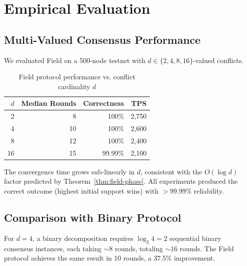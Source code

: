 \section{Empirical Evaluation}

\label{sec:field-evaluation}

\subsection{Multi-Valued Consensus Performance}

We evaluated Field on a 500-node testnet with $d \in \{2, 4, 8, 16\}$-valued conflicts.

\begin{table}[h]
\centering
\begin{tabular}{@{}rrrr@{}}
\toprule
$d$ & \textbf{Median Rounds} & \textbf{Correctness} & \textbf{TPS} \\
\midrule
2 & 8 & 100\% & 2,750 \\
4 & 10 & 100\% & 2,600 \\
8 & 12 & 100\% & 2,400 \\
16 & 15 & 99.99\% & 2,100 \\
\bottomrule
\end{tabular}
\caption{Field protocol performance vs. conflict cardinality $d$}
\label{tab:field-multival}
\end{table}

The convergence time grows sub-linearly in $d$, consistent with the $O(\log d)$ factor
predicted by Theorem~\ref{thm:field-phase}. All experiments produced the correct outcome
(highest initial support wins) with $> 99.99\%$ reliability.

\subsection{Comparison with Binary Protocol}

For $d = 4$, a binary decomposition requires $\log_2 4 = 2$ sequential binary consensus
instances, each taking $\sim 8$ rounds, totaling $\sim 16$ rounds. The Field protocol
achieves the same result in 10 rounds, a 37.5\% improvement.

